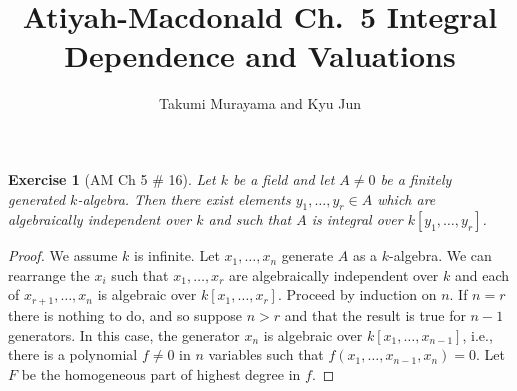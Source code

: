 \documentclass[12pt,letterpaper]{article}
\title{Atiyah-Macdonald Ch.~5 Integral Dependence and Valuations}
\author{Takumi Murayama and Kyu Jun}
\newtheorem{problem}{Exercise}[section]
\theoremstyle{definition}
\theoremstyle{remark}
\numberwithin{figure}{problem}
\numberwithin{equation}{section}
\begin{document}
\maketitle
\setcounter{section}{5}
\begin{problem}[AM Ch 5 \# 16]
  Let $k$ be a field and let $A \ne 0$ be a finitely generated $k$-algebra. Then there exist elements $y_1,\ldots,y_r \in A$ which are algebraically independent over $k$ and such that $A$ is integral over $k[y_1,\ldots,y_r]$.
\end{problem}
\begin{proof}
  We assume $k$ is infinite. Let $x_1,\ldots,x_n$ generate $A$ as a $k$-algebra. We can rearrange the $x_i$ such that $x_1,\ldots,x_r$ are algebraically independent over $k$ and each of $x_{r+1},\ldots,x_n$ is algebraic over $k[x_1,\ldots,x_r]$. Proceed by induction on $n$. If $n = r$ there is nothing to do, and so suppose $n > r$ and that the result is true for $n-1$ generators. In this case, the generator $x_n$ is algebraic over $k[x_1,\ldots,x_{n-1}]$, i.e., there is a polynomial $f \ne 0$ in $n$ variables such that $f(x_1,\ldots,x_{n-1},x_n) = 0$. Let $F$ be the homogeneous part of highest degree in $f$. 
\end{proof}
\end{document}
